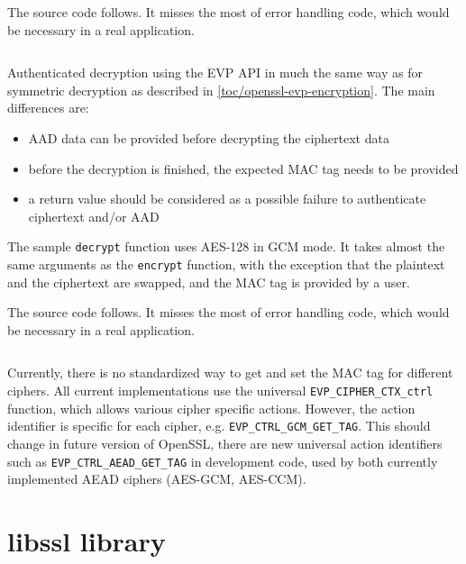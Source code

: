 The source code follows. It misses the most of error handling code, which would be necessary in a real application.

\inputminted{c}{code/openssl-evp-aead-encrypt.c}

Authenticated decryption using the EVP API in much the same way as for symmetric decryption as described in \autoref{toc/openssl-evp-encryption}. The main differences are:

\begin{itemize}
  \item AAD data can be provided before decrypting the ciphertext data
  \item before the decryption is finished, the expected MAC tag needs to be provided
  \item a return value should be considered as a possible failure to authenticate ciphertext and/or AAD
\end{itemize}

The sample \texttt{decrypt} function uses AES-128 in GCM mode. It takes almost the same arguments as the \texttt{encrypt} function, with the exception that the plaintext and the ciphertext are swapped, and the MAC tag is provided by a user.

The source code follows. It misses the most of error handling code, which would be necessary in a real application.

\inputminted{c}{code/openssl-evp-aead-decrypt.c}

Currently, there is no standardized way to get and set the MAC tag for different ciphers. All current implementations use the universal \texttt{EVP\_CIPHER\_CTX\_ctrl} function, which allows various cipher specific actions. However, the action identifier is specific for each cipher, e.g. \texttt{EVP\_CTRL\_GCM\_GET\_TAG}. This should change in future version of OpenSSL, there are new universal action identifiers such as \texttt{EVP\_CTRL\_AEAD\_GET\_TAG} in development code, used by both currently implemented AEAD ciphers (AES-GCM, AES-CCM).


\section{libssl library}
